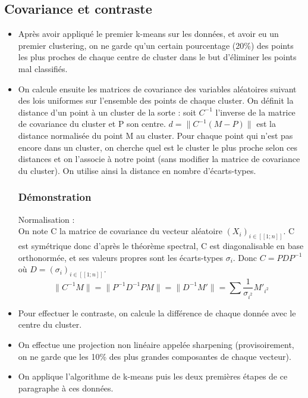 \documentclass[a4paper,10pt]{article}
\begin{document}
\subsection{Covariance et contraste}
\begin{itemize}
\item Après avoir appliqué le premier k-means sur les données, et avoir eu un premier clustering, on ne garde qu’un certain pourcentage (20\%) des points les plus proches de chaque centre de cluster dans le but d’éliminer les points mal classifiés.

\item On calcule ensuite les matrices de covariance des variables aléatoires suivant des lois uniformes sur l’ensemble des points de chaque cluster. On définit la distance d’un point à un cluster de la sorte : soit $C^{-1}$ l’inverse de la matrice de covariance du cluster et P son centre. $d=\|C^{-1}(M-P)\|$ est la distance normalisée du point M au cluster. Pour chaque point qui n’est pas encore dans un cluster, on cherche quel est le cluster le plus proche selon ces distances et on l’associe à notre point (sans modifier la matrice de covariance du cluster). On utilise ainsi la distance en nombre d’écarts-types.

\subsubsection*{Démonstration}

Normalisation : \\ On note C la matrice de covariance du vecteur aléatoire \mbox{$(X_{i})_{i \in [\![1;n]\!] }$}. 
C est symétrique donc d'après le théorème spectral, C est diagonalisable en base orthonormée, et ses valeurs propres sont les écarts-types \mbox{$\sigma_{i}$}. Donc $C=PDP^{-1}$ où $D=(\sigma_{i})_{i \in [\![1;n]\!]}$.
\[\|C^{-1}M\| = \|P^{-1}D^{-1}PM\|= \|D^{-1}M'\|= \sum \frac{1}{\sigma_{i^2}}{M'_{i^2}}\]

\item Pour effectuer le contraste, on calcule la différence de chaque donnée avec le centre du cluster.

\item On effectue une projection non linéaire appelée sharpening (provisoirement, on ne garde que les 10\% des plus grandes composantes de chaque vecteur).

\item On applique l’algorithme de k-means puis les deux premières étapes de ce paragraphe à ces données.

\end{itemize}
\end{document}
